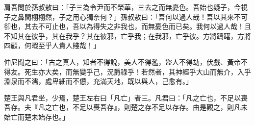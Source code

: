 \begin{pinyinscope}
肩吾問於孫叔敖曰：「子三為令尹而不榮華，三去之而無憂色。吾始也疑子，今視子之鼻間栩栩然，子之用心獨奈何？」孫叔敖曰：「吾何以過人哉！吾以其來不可卻也，其去不可止也，吾以為得失之非我也，而無憂色而已矣。我何以過人哉！且不知其在彼乎，其在我乎？其在彼邪，亡乎我；在我邪，亡乎彼。方將躊躇，方將四顧，何暇至乎人貴人賤哉！」

仲尼聞之曰：「古之真人，知者不得說，美人不得濫，盜人不得劫，伏戲、黃帝不得友。死生亦大矣，而無變乎己，況爵祿乎！若然者，其神經乎大山而無介，入乎淵泉而不濡，處卑細而不憊，充滿天地，既以與人，己愈有。」

楚王與凡君坐，少焉，楚王左右曰「凡亡」者三。凡君曰：「凡之亡也，不足以喪吾存。夫『凡之亡也，不足以喪吾存』，則楚之存不足以存存。由是觀之，則凡未始亡而楚未始存也。」


\end{pinyinscope}